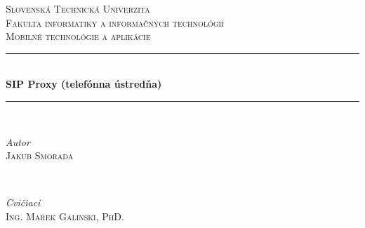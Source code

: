 \begin{titlepage} %
	\newcommand{\HRule}{\rule{\linewidth}{0.5mm}} %
	
	\center %
	
	
	\textsc{\LARGE Slovenská Technická Univerzita}\\[1.5cm] %
	
	\textsc{\Large Fakulta informatiky a informačných technológií}\\[0.5cm] %
	
	\textsc{\large Mobilné technológie a aplikácie}\\[0.5cm] %
	
	
	\HRule\\[0.4cm]
	
	{\huge\bfseries SIP Proxy (telefónna ústredňa)}\\[0.4cm] %
	
	\HRule\\[1.5cm]
	
	
	\begin{minipage}{0.4\textwidth}
		\begin{flushleft}
			\large
			\textit{Autor}\\
			\textsc{Jakub Smorada} %
		\end{flushleft}
	\end{minipage}
	~
	\begin{minipage}{0.4\textwidth}
		\begin{flushright}
			\large
			\textit{Cvičiaci}\\
			\textsc{Ing. Marek Galinski, PhD.} %
		\end{flushright}
	\end{minipage}
	
	

\end{titlepage}
